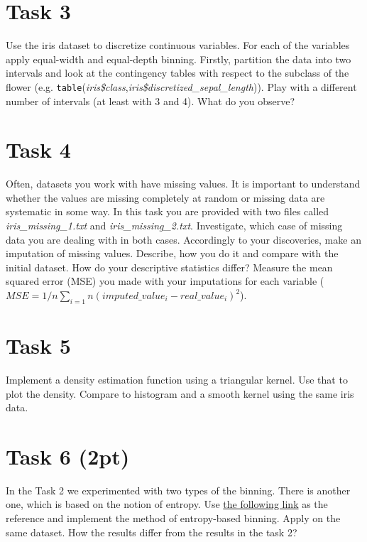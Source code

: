 \documentclass{article}
\begin{document}
\section*{Task 3}
Use the iris dataset to discretize continuous variables. For each of the variables apply equal-width and equal-depth binning. Firstly, partition the data into two intervals and look at the contingency tables with respect to the subclass of the flower (e.g.  \texttt{table}(\emph{iris\$class},\emph{iris\$discretized\_sepal\_length})). Play with a different number of intervals (at least with 3 and 4). What do you observe?

\section*{Task 4}
Often, datasets you work with have missing values. It is important to understand whether the values are missing completely at random or missing data are systematic in some way. In this task you are provided with two files called \emph{iris\_missing\_1.txt} and \emph{iris\_missing\_2.txt}. Investigate, which case of missing data you are dealing with in both cases. Accordingly to your discoveries, make an imputation of missing values. Describe, how you do it and compare with the initial dataset. How do your descriptive statistics differ? Measure the mean squared error (MSE) you made with your imputations for each variable ($MSE = 1/n \sum_{i=1}{n}(imputed\_value_{i} - real\_value_{i})^2$).

\section*{Task 5}
Implement a density estimation function using a triangular kernel. Use that to plot the density. Compare to histogram and a smooth kernel using the same iris data. 

\section*{Task 6 (2pt)}
In the Task 2 we experimented with two types of the binning. There is another one, which is based on the notion of entropy. Use  \href{http://www.saedsayad.com/supervised_binning.htm}{the following link} as the reference and implement the method of entropy-based binning. Apply on the same dataset. How the results differ from the results in the task 2?
\end{document}
